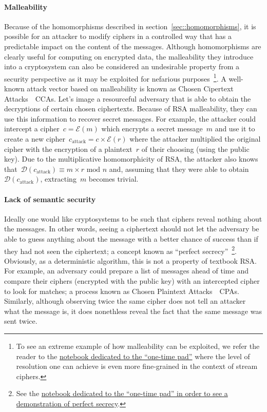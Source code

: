 \documentclass{article}
\begin{document}
\paragraph{Malleability}  Because of the homomorphisms described in section~\ref{sec::homomorphisms}, it is possible for an attacker to modify ciphers in a controlled way that has a predictable impact on the content of the messages.  Although homomorphisms are clearly useful for computing on encrypted data, the malleability they introduce into a cryptosystem can also be considered an undesirable property from a security perspective as it may be exploited for nefarious purposes~\footnote{To see an extreme example of how malleability can be exploited, we refer the reader to the \href{https://github.com/Ranlot/public-key-encryption}{notebook dedicated to the ``one-time pad''} where the level of resolution one can achieve is even more fine-grained in the context of stream ciphers.}. A well-known attack vector based on malleability is known as Chosen Cipertext Attacks~\textemdash~CCAs. Let's image a resourceful adversary that is able to obtain the decryptions of certain chosen ciphertexts.  Because of RSA malleability, they can use this information to recover secret messages. For example, the attacker could intercept a cipher~$c = \mathcal{E}(m)$ which encrypts a secret message~$m$ and use it to create a new cipher~$c_\text{attack} = c \times \mathcal{E}(r)$ where the attacker multiplied the original cipher with the encryption of a plaintext~$r$ of their choosing (using the public key).  Due to the multiplicative homomorphicity of RSA, the attacker also knows that~$\mathcal{D}(c_\text{attack}) \equiv m \times r \,\,\text{mod}\,\,n$ and, assuming that they were able to obtain~$\mathcal{D}(c_\text{attack})$, extracting~$m$ becomes trivial. 

\paragraph{Lack of semantic security}  Ideally one would like cryptosystems to be such that ciphers reveal nothing about the messages.  In other words, seeing a ciphertext should not let the adversary be able to guess anything about the message with a better chance of success than if they had not seen the ciphertext; a concept known as ``perfect secrecy''~\footnote{See the \href{https://github.com/Ranlot/public-key-encryption}{notebook dedicated to the ``one-time pad'' in order to see a demonstration of perfect secrecy}.}. Obviously, as a deterministic algorithm, this is not a property of textbook RSA.  For example, an adversary could prepare a list of messages ahead of time and compare their ciphers (encrypted with the public key) with an intercepted cipher to look for matches; a process known as Chosen Plaintext Attacks~\textemdash~CPAs.  Similarly, although observing twice the same cipher does not tell an attacker what the message is, it does nonethless reveal the fact that the same message was sent twice. \\
\end{document}
